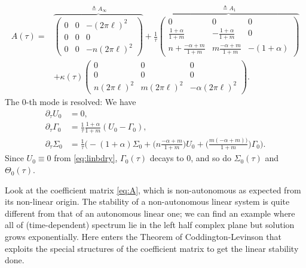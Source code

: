 \documentclass[a4paper,11pt]{article}
\def\l{(2\pi \ell)}
\theoremstyle{remark}
\begin{document}
\begin{equation}
\begin{aligned}
  A(\tau)=
  &\overbrace{\begin{pmatrix}
   0 & 0 & -\l^2\\
   0 & 0 & 0\\
   0 & 0 & -n\l^2
  \end{pmatrix} }^{\triangleq A_\infty}
  + \frac{1}{\tau}
  \overbrace{\begin{pmatrix}
   0 & 0 & 0\\
   \frac{1+\alpha}{1+m} & -\frac{1+\alpha}{1+m} & 0\\
   n+ \frac{-\alpha+m}{1+m} & m\frac{-\alpha+m}{1+m}& -(1+\alpha)
  \end{pmatrix} }^{\triangleq A_1}\\
  &+\kappa(\tau) \begin{pmatrix}
   0 & 0 & 0\\
   0 & 0 & 0\\
   n\l^2 & m\l^2 & -\alpha\l^2
  \end{pmatrix}.%
\end{aligned} \label{eq:A}
\end{equation}
The $0$-th mode is resolved: We have
\begin{align*}
   \partial_\tau U_0 &= 0,\\
  \partial_\tau\Gamma_0 &= \frac{1}{\tau}\frac{1+\alpha}{1+m}(U_0-\Gamma_0),\\
  \partial_\tau\Sigma_0 &= \frac{1}{\tau}\Big( -(1+\alpha)\Sigma_0 + \big(n\frac{-\alpha+m}{1+m}\big)U_0 + \big(\frac{m(-\alpha+m))}{1+m}\big)\Gamma_0\Big).
\end{align*}
Since $U_0\equiv0$ from \eqref{eq:linbdry}, $\Gamma_0(\tau)$ decays to $0$, and so do $\Sigma_0(\tau)$ and $\Theta_0(\tau)$.


Look at the coefficient matrix \eqref{eq:A}, which is non-autonomous as expected from its non-linear origin. The stability of a non-autonomous linear system is quite different from that of an autonomous linear one; we can find an example where all of (time-dependent) spectrum lie in the left half complex plane but solution grows exponentially. Here enters the Theorem of Coddington-Levinson that exploits the special structures of the coefficient matrix to get the linear stability done.
\end{document}

